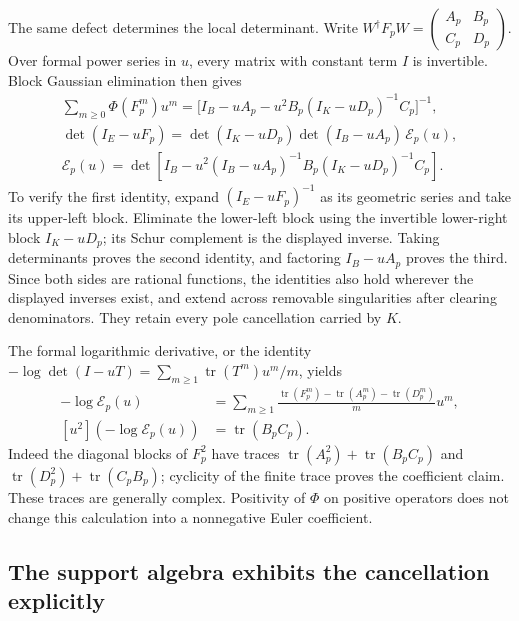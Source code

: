 \documentclass[11pt]{article}
\begin{document}
The same defect determines the local determinant. Write
$W^\dagger F_pW=\left(\begin{smallmatrix}A_p&B_p\\C_p&D_p\end{smallmatrix}\right)$.
Over formal power series in $u$, every matrix with constant term $I$ is
invertible. Block Gaussian elimination then gives
\begin{equation}\tag{TDP9}
\begin{gathered}
\sum_{m\ge0}\Phi(F_p^m)u^m
 =\bigl[I_B-uA_p-u^2B_p(I_K-uD_p)^{-1}C_p\bigr]^{-1},\\
\det(I_E-uF_p)
 =\det(I_K-uD_p)\det(I_B-uA_p)\,\mathcal E_p(u),\\
\mathcal E_p(u)=
\det\!\left[I_B-u^2(I_B-uA_p)^{-1}
 B_p(I_K-uD_p)^{-1}C_p\right].
\end{gathered}
\end{equation}
To verify the first identity, expand $(I_E-uF_p)^{-1}$ as its geometric
series and take its upper-left block. Eliminate the lower-left block
using the invertible lower-right block $I_K-uD_p$; its Schur complement
is the displayed inverse. Taking determinants proves the second
identity, and factoring $I_B-uA_p$ proves the third. Since both sides are
rational functions, the identities also hold wherever the displayed
inverses exist, and extend across removable singularities after clearing
denominators. They retain every pole cancellation carried by $K$.

The formal logarithmic derivative, or the identity
$-\log\det(I-uT)=\sum_{m\ge1}\operatorname{tr}(T^m)u^m/m$, yields
\begin{equation}\tag{TDP10}
\begin{aligned}
-\log\mathcal E_p(u)
 &=\sum_{m\ge1}
 \frac{\operatorname{tr}(F_p^m)-\operatorname{tr}(A_p^m)
 -\operatorname{tr}(D_p^m)}{m}u^m,\\
[u^2](-\log\mathcal E_p(u))&=\operatorname{tr}(B_pC_p).
\end{aligned}
\end{equation}
Indeed the diagonal blocks of $F_p^2$ have traces
$\operatorname{tr}(A_p^2)+\operatorname{tr}(B_pC_p)$ and
$\operatorname{tr}(D_p^2)+\operatorname{tr}(C_pB_p)$; cyclicity of the
finite trace proves the coefficient claim. These traces are generally
complex. Positivity of $\Phi$ on positive operators does not change this
calculation into a nonnegative Euler coefficient.

\subsection{The support algebra exhibits the cancellation explicitly}
\end{document}
